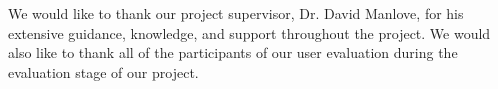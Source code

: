 We would like to thank our project supervisor, Dr. David Manlove, for his
extensive guidance, knowledge, and support throughout the project. We would also
like to thank all of the participants of our user evaluation during the
evaluation stage of our project.
